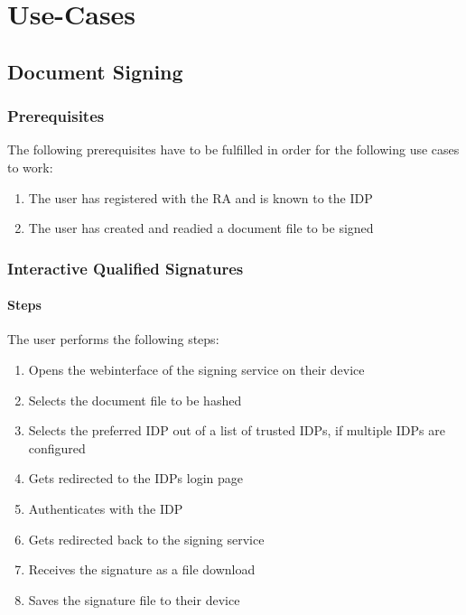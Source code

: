 \chapter{Use-Cases}
\label{ch:usecases}

\section{Document Signing}\label{sec:document-signing}

\subsection{Prerequisites}\label{subsec:prerequisites}
The following prerequisites have to be fulfilled in order for the following use cases to work:
\begin{enumerate}
    \item The user has registered with the \gls{RA} and is known to the \gls{IDP}
    \item The user has created and readied a document file to be signed
\end{enumerate}

\subsection{Interactive Qualified Signatures}\label{subsec:interactive-qualified-signatures}
\subsubsection{Steps}
The user performs the following steps:
\begin{enumerate}
    \item Opens the webinterface of the signing service on their device
    \item Selects the document file to be hashed
    \item Selects the preferred \gls{IDP} out of a list of trusted \gls{IDP}s, if multiple \gls{IDP}s are configured
    \item Gets redirected to the \gls{IDP}s login page
    \item Authenticates with the \gls{IDP}
    \item Gets redirected back to the signing service
    \item Receives the signature as a file download
    \item Saves the signature file to their device
\end{enumerate}

